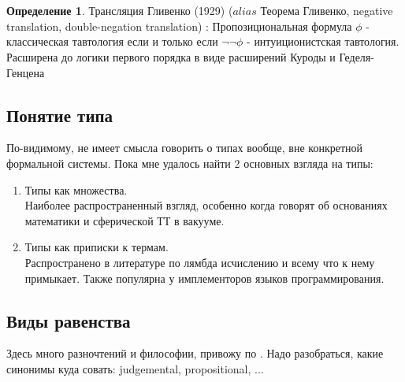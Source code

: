 \documentclass[10pt,a4paper]{article}
\theoremstyle{definition}
\newtheorem{Def}{Определение}
\begin{document}
\\
\\
\begin{Def}
Трансляция Гливенко (1929) ($alias$ Теорема Гливенко, negative translation, double-negation translation) :  Пропозициональная формула $\phi$ - классическая тавтология если и только если $\neg \neg \phi$ - интуиционистская тавтология. Расширена до логики первого порядка в виде расширений Куроды и Геделя-Генцена\\
\end{Def}

\subsection{Понятие типа}
По-видимому, не имеет смысла говорить о типах вообще, вне конкретной формальной системы. Пока мне удалось найти 2 основных взгляда на типы:
\begin{enumerate}
\item Типы как множества. \\
  Наиболее распространенный взгляд, особенно когда говорят об основаниях математики и сферической ТТ в вакууме.
\item Типы как приписки к термам. \\
  Распространено в литературе по лямбда исчислению и всему что к нему примыкает. Также популярна у имплементоров языков программирования.
\end{enumerate}

\subsection{Виды равенства}

Здесь много разночтений и философии, привожу по \cite{PML1980}.
Надо разобраться, какие синонимы куда совать: judgemental, propositional, ...
\end{document}
